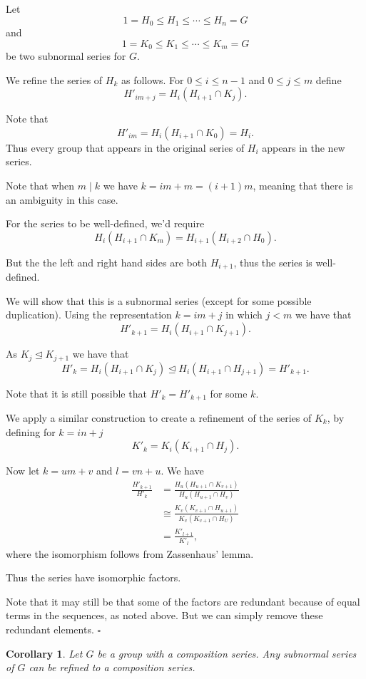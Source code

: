 \documentclass[10pt]{article}
\newtheorem{corollary}[theorem]{Corollary}
\newenvironment{proof}[1][Proof]{\begin{trivlist}
\item[\hskip \labelsep {\itshape #1}]}{\end{trivlist}}
\begin{document}
\begin{proof}
Let
$$1 = H_0 \leq H_1 \leq \cdots \leq H_n = G$$
and
$$1 = K_0 \leq K_1 \leq \cdots \leq K_m = G$$
be two subnormal series for $G$.

We refine the series of $H_k$ as follows. For $0 \leq i \leq n - 1$ and $0 \leq j \leq m$ define
$$H'_{im + j} = H_i(H_{i+1}\cap K_j).$$

Note that
$$H'_{im} = H_i(H_{i+1}\cap K_0) = H_i.$$
Thus every group that appears in the original series of $H_i$ appears in the new series.

Note that when $m \;|\; k$ we have $k = im + m = (i + 1)m$, meaning that there is an ambiguity in this case.

For the series to be well-defined, we'd require
$$H_i(H_{i+1}\cap K_m) = H_{i+1}(H_{i+2}\cap H_0).$$

But the the left and right hand sides are both $H_{i+1}$, thus the series is well-defined.

We will show that this is a subnormal series (except for some possible duplication). Using the representation $k = im + j$ in which $j < m$ we have that
$$H'_{k+1} = H_i(H_{i+1}\cap K_{j + 1}).$$

As $K_j \mathrel{\unlhd} K_{j+1}$ we have that
$$H'_k = H_i(H_{i+1}\cap K_j) \mathrel{\unlhd} H_i(H_{i+1}\cap H_{j+1}) = H'_{k+1}.$$

Note that it is still possible that $H'_k = H'_{k+1}$ for some $k$. 

We apply a similar construction to create a refinement of the series of $K_k$, by defining for $k = in + j$
$$K'_k = K_i(K_{i+1}\cap H_j).$$

Now let $k = um + v$ and $l = vn + u$. We have
\begin{align*}
\frac{H'_{k+1}}{H'_k} &= \frac{H_u(H_{u+1}\cap K_{v+1})}{H_u(H_{u+1}\cap H_v)}\\
&\cong \frac{K_v(K_{v+1}\cap H_{u+1})}{K_v(K_{v+1}\cap H_U)}\\
&= \frac{K'_{l+1}}{K'_l},
\end{align*}
where the isomorphism follows from Zassenhaus' lemma.

Thus the series have isomorphic factors.

Note that it may still be that some of the factors are redundant because of equal terms in the sequences, as noted above. But we can simply remove these redundant elements. $\square$
\end{proof}

\begin{corollary}
Let $G$ be a group with a composition series. Any subnormal series of $G$ can be refined to a composition series.
\end{corollary}
\end{document}
